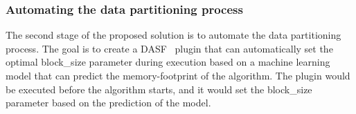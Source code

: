 \subsubsection{Automating the data partitioning process}

The second stage of the proposed solution is to automate the data partitioning process.
The goal is to create a \ac{DASF}~\cite{dasf} plugin that can automatically set the optimal block\_size parameter during execution based on a machine learning model that can predict the memory-footprint of the algorithm.
The plugin would be executed before the algorithm starts, and it would set the block\_size parameter based on the prediction of the model.
